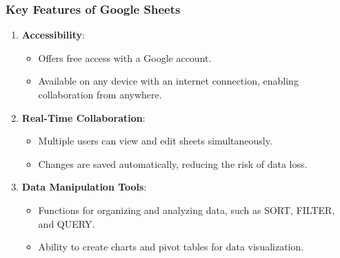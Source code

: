 \documentclass[aspectratio=169]{beamer}
\begin{document}
\begin{frame}[fragile]
    \frametitle{Key Features of Google Sheets}
    \begin{enumerate}
        \item \textbf{Accessibility}:
            \begin{itemize}
                \item Offers free access with a Google account.
                \item Available on any device with an internet connection, enabling collaboration from anywhere.
            \end{itemize}
        
        \item \textbf{Real-Time Collaboration}:
            \begin{itemize}
                \item Multiple users can view and edit sheets simultaneously.
                \item Changes are saved automatically, reducing the risk of data loss.
            \end{itemize}
        
        \item \textbf{Data Manipulation Tools}:
            \begin{itemize}
                \item Functions for organizing and analyzing data, such as SORT, FILTER, and QUERY.
                \item Ability to create charts and pivot tables for data visualization.
            \end{itemize}
    \end{enumerate}
\end{frame}
\end{document}
